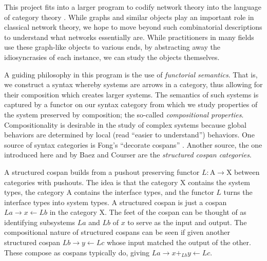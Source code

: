 \documentclass{amsart}
\newcommand{\A}{\cat{A}}
\newcommand{\X}{\cat{X}}
\newcommand{\cat}[1]{\mathrm{#1}}
\newcommand{\from}{\colon}
\renewcommand{\gets}{\leftarrow}
\theoremstyle{remark}
\theoremstyle{definition}
\begin{document}
This project fits into a larger program to codify network theory into
the language of category theory
\cite{OpenPetri,RxNets,PassiveNets,NetMods,MrkvProc}.  While graphs
and similar objects play an important role in classical network
theory, we hope to move beyond such combinatorial descriptions to
understand what networks essentially are. While practitioners in many
fields use these graph-like objects to various ends, by abstracting
away the idiosyncrasies of each instance, we can study the objects
themselves.

A guiding philosophy in this program is the use of \emph{functorial
  semantics}. That is, we construct a syntax whereby systems are
arrows in a category, thus allowing for their composition which
creates larger systems.  The semantics of such systems is captured by
a functor on our syntax category from which we study properties of the
system preserved by composition; the so-called \emph{compositional
  properties}. Compositionality is desirable in the study of complex
systems because global behaviors are determined by local (read
``easier to understand'') behaviors. One source of syntax categories
is Fong's ``decorate cospans'' \cite{DecorCsp}. Another source, the
one introduced here and by Baez and Courser \cite{StrCsp} are the
\emph{structured cospan categories}.

A structured cospan builds from a pushout preserving functor
$ L \from \A \to \X $ between categories with pushouts.  The idea is
that the category $ \X $ contains the system types, the category
$ \A $ contains the interface types, and the functor $ L $ turns the
interface types into system types. A structured cospan is just a
cospan $ La \to x \gets Lb $ in the category $ \X $.  The feet of the
cospan can be thought of as identifying subsystems $ La $ and $ Lb $
of $ x $ to serve as the input and output. The compositional nature of
structured cospans can be seen if given another structured cospan
$ Lb \to y \gets Lc $ whose input matched the output of the other.
These compose as cospans typically do, giving
$ La \to x+_{Lb} y \gets Lc $.
\end{document}
